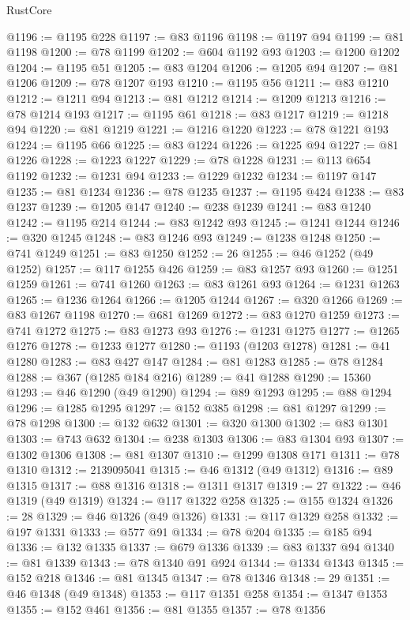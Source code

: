 \begin{lexlean}{RustCore}
\begin{coremodule}
@1196 := @1195 @228
@1197 := @83 @1196
@1198 := @1197 @94
@1199 := @81 @1198
@1200 := @78 @1199
@1202 := @604 @1192 @93
@1203 := @1200 @1202
@1204 := @1195 @51
@1205 := @83 @1204
@1206 := @1205 @94
@1207 := @81 @1206
@1209 := @78 @1207 @193
@1210 := @1195 @56
@1211 := @83 @1210
@1212 := @1211 @94
@1213 := @81 @1212
@1214 := @1209 @1213
@1216 := @78 @1214 @193
@1217 := @1195 @61
@1218 := @83 @1217
@1219 := @1218 @94
@1220 := @81 @1219
@1221 := @1216 @1220
@1223 := @78 @1221 @193
@1224 := @1195 @66
@1225 := @83 @1224
@1226 := @1225 @94
@1227 := @81 @1226
@1228 := @1223 @1227
@1229 := @78 @1228
@1231 := @113 @654 @1192
@1232 := @1231 @94
@1233 := @1229 @1232
@1234 := @1197 @147
@1235 := @81 @1234
@1236 := @78 @1235
@1237 := @1195 @424
@1238 := @83 @1237
@1239 := @1205 @147
@1240 := @238 @1239
@1241 := @83 @1240
@1242 := @1195 @214
@1244 := @83 @1242 @93
@1245 := @1241 @1244
@1246 := @320 @1245
@1248 := @83 @1246 @93
@1249 := @1238 @1248
@1250 := @741 @1249
@1251 := @83 @1250
@1252 := 26
@1255 := @46 @1252 (@49 @1252)
@1257 := @117 @1255 @426
@1259 := @83 @1257 @93
@1260 := @1251 @1259
@1261 := @741 @1260
@1263 := @83 @1261 @93
@1264 := @1231 @1263
@1265 := @1236 @1264
@1266 := @1205 @1244
@1267 := @320 @1266
@1269 := @83 @1267 @1198
@1270 := @681 @1269
@1272 := @83 @1270 @1259
@1273 := @741 @1272
@1275 := @83 @1273 @93
@1276 := @1231 @1275
@1277 := @1265 @1276
@1278 := @1233 @1277
@1280 := @1193 (@1203 @1278)
@1281 := @41 @1280
@1283 := @83 @427 @147
@1284 := @81 @1283
@1285 := @78 @1284
@1288 := @367 (@1285 @184 @216)
@1289 := @41 @1288
@1290 := 15360
@1293 := @46 @1290 (@49 @1290)
@1294 := @89 @1293
@1295 := @88 @1294
@1296 := @1285 @1295
@1297 := @152 @385
@1298 := @81 @1297
@1299 := @78 @1298
@1300 := @132 @632
@1301 := @320 @1300
@1302 := @83 @1301
@1303 := @743 @632
@1304 := @238 @1303
@1306 := @83 @1304 @93
@1307 := @1302 @1306
@1308 := @81 @1307
@1310 := @1299 @1308 @171
@1311 := @78 @1310
@1312 := 2139095041
@1315 := @46 @1312 (@49 @1312)
@1316 := @89 @1315
@1317 := @88 @1316
@1318 := @1311 @1317
@1319 := 27
@1322 := @46 @1319 (@49 @1319)
@1324 := @117 @1322 @258
@1325 := @155 @1324
@1326 := 28
@1329 := @46 @1326 (@49 @1326)
@1331 := @117 @1329 @258
@1332 := @197 @1331
@1333 := @577 @91
@1334 := @78 @204
@1335 := @185 @94
@1336 := @132 @1335
@1337 := @679 @1336
@1339 := @83 @1337 @94
@1340 := @81 @1339
@1343 := @78 @1340 @91 @924
@1344 := @1334 @1343
@1345 := @152 @218
@1346 := @81 @1345
@1347 := @78 @1346
@1348 := 29
@1351 := @46 @1348 (@49 @1348)
@1353 := @117 @1351 @258
@1354 := @1347 @1353
@1355 := @152 @461
@1356 := @81 @1355
@1357 := @78 @1356

\end{coremodule}
\end{lexlean}
